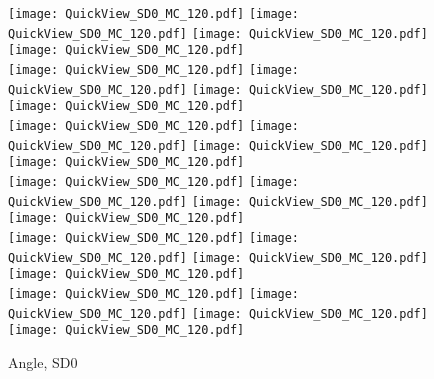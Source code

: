 \documentclass[amsmath,amssymb,aps,floatfix]{revtex4-1}
\begin{document}
\begin{figure}
   \centering
   \texttt{[image: QuickView\_SD0\_MC\_120.pdf]}
   \texttt{[image: QuickView\_SD0\_MC\_120.pdf]}
   \texttt{[image: QuickView\_SD0\_MC\_120.pdf]}
   \texttt{[image: QuickView\_SD0\_MC\_120.pdf]}\\
   \texttt{[image: QuickView\_SD0\_MC\_120.pdf]}
   \texttt{[image: QuickView\_SD0\_MC\_120.pdf]}
   \texttt{[image: QuickView\_SD0\_MC\_120.pdf]}
   \texttt{[image: QuickView\_SD0\_MC\_120.pdf]}\\
   \texttt{[image: QuickView\_SD0\_MC\_120.pdf]}
   \texttt{[image: QuickView\_SD0\_MC\_120.pdf]}
   \texttt{[image: QuickView\_SD0\_MC\_120.pdf]}
   \texttt{[image: QuickView\_SD0\_MC\_120.pdf]}\\
   \texttt{[image: QuickView\_SD0\_MC\_120.pdf]}
   \texttt{[image: QuickView\_SD0\_MC\_120.pdf]}
   \texttt{[image: QuickView\_SD0\_MC\_120.pdf]}
   \texttt{[image: QuickView\_SD0\_MC\_120.pdf]}\\
   \texttt{[image: QuickView\_SD0\_MC\_120.pdf]}
   \texttt{[image: QuickView\_SD0\_MC\_120.pdf]}
   \texttt{[image: QuickView\_SD0\_MC\_120.pdf]}
   \texttt{[image: QuickView\_SD0\_MC\_120.pdf]}\\
   \texttt{[image: QuickView\_SD0\_MC\_120.pdf]}
   \texttt{[image: QuickView\_SD0\_MC\_120.pdf]}
   \texttt{[image: QuickView\_SD0\_MC\_120.pdf]}
   \texttt{[image: QuickView\_SD0\_MC\_120.pdf]}\\
   \caption{Angle, SD0}
   \label{Figure:SD0Result}
\end{figure}
\end{document}
